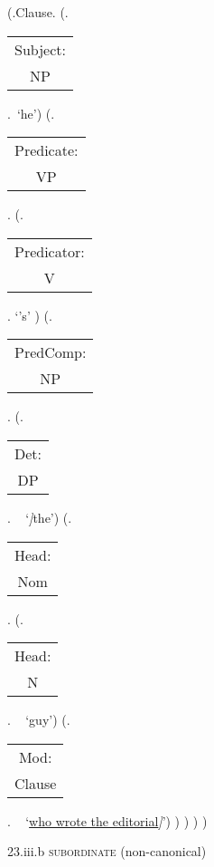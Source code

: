 \documentclass[12pt,letterpaper]{article}
\begin{document}
\begin{figure}
	\begin{center}
		\begin{parsetree}
			(.Clause.
			(.\begin{tabular}{c}Subject:\\NP\end{tabular}.~`he')
			(.\begin{tabular}{c}Predicate:\\VP\end{tabular}.
			(.\begin{tabular}{c}Predicator:\\V\end{tabular}. `{'s}' )
			(.\begin{tabular}{c}PredComp:\\NP\end{tabular}.
			(.\begin{tabular}{c}Det:\\DP\end{tabular}. ~ `\emph{]}the')
			(.\begin{tabular}{c}Head:\\Nom\end{tabular}. 
			(.\begin{tabular}{c}Head:\\N\end{tabular}. ~ `guy')
			(.\begin{tabular}{c}Mod:\\Clause\end{tabular}. ~ 
			 `\underline{who wrote the editorial}\emph{]}')
			)
			)
			)
			)
			
			\hfill \break\hfill \break
		\end{parsetree}
		23.iii.b \textsc{subordinate} (non-canonical)
	\end{center}
\end{figure}
\end{document}
